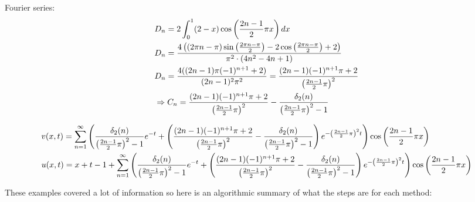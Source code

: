 \documentclass[11pt, fleqn]{article}
\begin{document}
Fourier series:
\begin{align*}
    &D_n=2\int_0^1(2-x)\cos\left( \frac{2n-1}{2}\pi x \right)dx\\
    &D_n=\dfrac{4\left(\left(2{\pi}n-{\pi}\right)\sin\left(\frac{2{\pi}n-{\pi}}{2}\right)-2\cos\left(\frac{2{\pi}n-{\pi}}{2}\right)+2\right)}{{\pi}^2\cdot\left(4n^2-4n+1\right)}\\
    &D_n=\frac{4((2n-1)\pi(-1)^{n+1}+2)}{(2n-1)^2\pi^2}=\frac{(2n-1)(-1)^{n+1}\pi+2}{\left( \frac{2n-1}{2}\pi \right)^2}\\
    &\Rightarrow C_n=\frac{(2n-1)(-1)^{n+1}\pi+2}{\left( \frac{2n-1}{2}\pi \right)^2}-\frac{\delta_2(n)}{\left( \frac{2n-1}{2}\pi \right)^2-1}
\end{align*}
\begin{scriptsize}
\begin{align*}
    &v(x,t)=\sum_{n=1}^\infty\left( \frac{\delta_2(n)}{\left( \frac{2n-1}{2}\pi \right)^2-1}e^{-t}+\left( \frac{(2n-1)(-1)^{n+1}\pi+2}{\left( \frac{2n-1}{2}\pi \right)^2}-\frac{\delta_2(n)}{\left( \frac{2n-1}{2}\pi \right)^2-1} \right)e^{-\left( \frac{2n-1}{2}\pi \right)^2t} \right)\cos\left( \frac{2n-1}{2}\pi x \right)\\
    &u(x,t)=x+t-1+\sum_{n=1}^\infty\left( \frac{\delta_2(n)}{\left( \frac{2n-1}{2}\pi \right)^2-1}e^{-t}+\left( \frac{(2n-1)(-1)^{n+1}\pi+2}{\left( \frac{2n-1}{2}\pi \right)^2}-\frac{\delta_2(n)}{\left( \frac{2n-1}{2}\pi \right)^2-1} \right)e^{-\left( \frac{2n-1}{2}\pi \right)^2t} \right)\cos\left( \frac{2n-1}{2}\pi x \right)
\end{align*}
\end{scriptsize}

These examples covered a lot of information so here is an algorithmic summary of what the steps are for each method:\\
\end{document}
